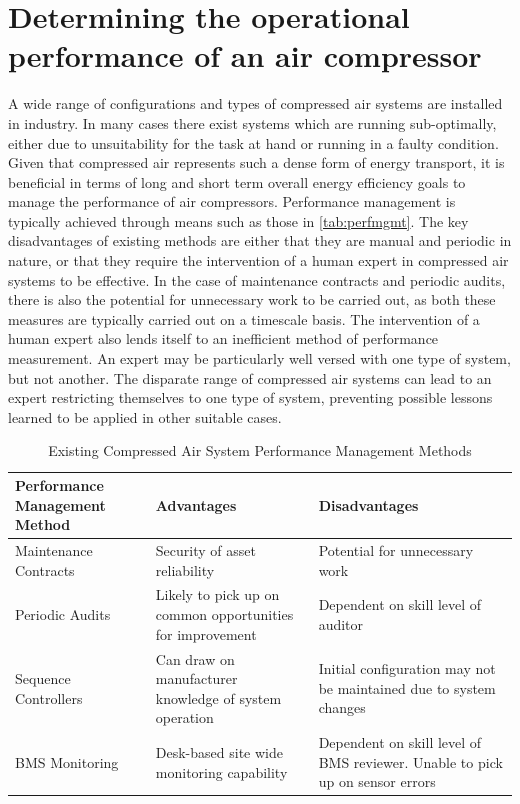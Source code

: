 


\section{Determining the operational performance of an air compressor}
\label{sec:probstatement}
A wide range of configurations and types of compressed air systems are installed in industry. In many cases there exist systems which are running sub-optimally, either due to unsuitability for the task at hand or running in a faulty condition. Given that compressed air represents such a dense form of energy transport, it is beneficial in terms of long and short term overall energy efficiency goals to manage the performance of air compressors. Performance management is typically achieved through means such as those in  \autoref{tab:perfmgmt}. The key disadvantages of existing methods are either that they are manual and periodic in nature, or that they require the intervention of a human expert in compressed air systems to be effective. In the case of maintenance contracts and periodic audits, there is also the potential for unnecessary work to be carried out, as both these measures are typically carried out on a timescale basis. The intervention of a human expert also lends itself to an inefficient method of performance measurement. An expert may be particularly well versed with one type of system, but not another. The disparate range of compressed air systems can lead to an expert restricting themselves to one type of system, preventing possible lessons learned to be applied in other suitable cases.

\begin{table}
  \centering
  \caption{Existing Compressed Air System Performance Management Methods}
    \begin{tabular}{p{.3\linewidth}p{.3\linewidth}p{.3\linewidth}}
    \toprule
    Performance Management Method & Advantages & Disadvantages \\
    \midrule
    Maintenance Contracts & Security of asset reliability & Potential for unnecessary work \\
    Periodic Audits & Likely to pick up on common opportunities for improvement & Dependent on skill level of auditor \\
    Sequence Controllers & Can draw on manufacturer knowledge of system operation & Initial configuration may not be maintained due to system changes \\
    BMS Monitoring & Desk-based site wide monitoring capability & Dependent on skill level of BMS reviewer. Unable to pick up on sensor errors \\
    \bottomrule
    \end{tabular}%
  \label{tab:perfmgmt}%
\end{table}%


